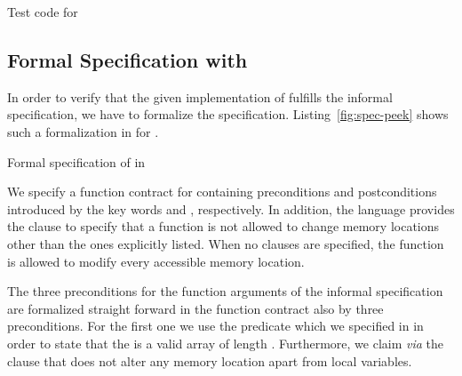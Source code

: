 \clearpage

\begin{listing}[hbt]
\begin{minipage}{\textwidth}

\end{minipage}
\caption{\label{lst:test_poke} Test code for \poke}
\end{listing}

\clearpage

\subsection{Formal Specification with \acsl}
\label{sec:formal-specification}
\label{formal-peek}


In order to verify that the given implementation of \peek fulfills 
the informal specification, we have to formalize the specification.
Listing~\ref{fig:spec-peek} shows such a formalization in \acsl for \peek.

\begin{listing}[hbt]
\begin{minipage}{\textwidth}

\end{minipage}
\caption{\label{fig:spec-peek} Formal specification of \peek in \acsl}
\end{listing}

We specify a function contract for \peek containing preconditions
and postconditions introduced by the key words 
and , respectively.
In addition, the \acsl language provides the  clause to specify 
that a function is not allowed to change memory locations other than the ones 
explicitly listed. 
When no  clauses are specified, 
the function is allowed to modify every accessible memory location. 

The three preconditions for the function arguments of the informal specification 
are formalized straight forward in the function contract also by three preconditions.
For the first one we use the predicate 
which we specified in \acsl in order to state that the 
is a valid array of length .
Furthermore, we claim {\it via} the  clause 
that \peek does not alter any memory location
apart from local variables.


